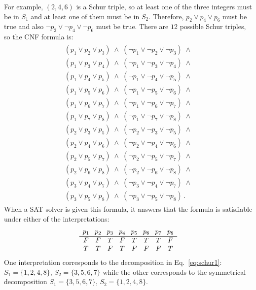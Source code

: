 For example, $(2,4,6)$ is a Schur triple, so at least one of the three integers must be in $S_1$ and at least one of them must be in $S_2$. Therefore, $p_2 \vee p_4 \vee p_6$ must be true and also $\neg p_2 \vee \neg p_4 \vee \neg p_6$ must be true. There are $12$ possible Schur triples, so the CNF formula is:
\begin{align}
\begin{array}{l}
(p_1 \vee p_2 \vee p_3) \;\wedge\; (\neg p_1 \vee \neg p_2 \vee \neg p_3) \;\wedge \\
(p_1 \vee p_3 \vee p_4) \;\wedge\; (\neg p_1 \vee \neg p_3 \vee \neg p_4) \;\wedge \\
(p_1 \vee p_4 \vee p_5) \;\wedge\; (\neg p_1 \vee \neg p_4 \vee \neg p_5) \;\wedge \\
(p_1 \vee p_5 \vee p_6) \;\wedge\; (\neg p_1 \vee \neg p_5 \vee \neg p_6) \;\wedge \\
(p_1 \vee p_6 \vee p_7) \;\wedge\; (\neg p_1 \vee \neg p_6 \vee \neg p_7) \;\wedge \\
(p_1 \vee p_7 \vee p_8) \;\wedge\; (\neg p_1 \vee \neg p_7 \vee \neg p_8) \;\wedge \\
(p_2 \vee p_3 \vee p_5) \;\wedge\; (\neg p_2 \vee \neg p_3 \vee \neg p_5) \;\wedge \\
(p_2 \vee p_4 \vee p_6) \;\wedge\; (\neg p_2 \vee \neg p_4 \vee \neg p_6) \;\wedge \\
(p_2 \vee p_5 \vee p_7) \;\wedge\; (\neg p_2 \vee \neg p_5 \vee \neg p_7) \;\wedge \\
(p_2 \vee p_6 \vee p_8) \;\wedge\; (\neg p_2 \vee \neg p_6 \vee \neg p_8) \;\wedge \\
(p_3 \vee p_4 \vee p_7) \;\wedge\; (\neg p_3 \vee \neg p_4 \vee \neg p_7) \;\wedge \\
(p_3 \vee p_5 \vee p_8) \;\wedge\; (\neg p_3 \vee \neg p_5 \vee \neg p_8)\,.
\end{array}\label{eq.schur2}
\end{align}
When a SAT solver is given this formula, it answers that the formula is satisfiable under either of the interpretations:
\[
\begin{array}{c@{\hspace{8pt}}c@{\hspace{8pt}}c@{\hspace{8pt}}c@{\hspace{8pt}}c@{\hspace{8pt}}c@{\hspace{8pt}}c@{\hspace{8pt}}c}
p_1&p_2&p_3&p_4&p_5&p_6&p_7&p_8\\\svhline
F&F&T&F&T&T&T&F\\
T&T&F&T&F&F&F&T
\end{array}
\]
One interpretation corresponds to the decomposition in Eq.~\ref{eq:schur1}: 
$S_1=\{1,2,4,8\}$, $S_2=\{3,5,6,7\}$ while the other corresponds to the symmetrical decomposition $S_1=\{3,5,6,7\}$, $S_2=\{1,2,4,8\}$.

